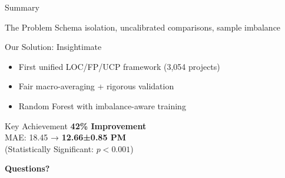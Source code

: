 \documentclass[aspectratio=169]{beamer}
\begin{document}
\begin{frame}{Summary}
\begin{block}{The Problem}
Schema isolation, uncalibrated comparisons, sample imbalance
\end{block}

\vspace{0.2cm}
\begin{block}{Our Solution: Insightimate}
\begin{itemize}
    \item First unified LOC/FP/UCP framework (3,054 projects)
    \item Fair macro-averaging + rigorous validation
    \item Random Forest with imbalance-aware training
\end{itemize}
\end{block}

\vspace{0.2cm}
\begin{exampleblock}{\Large Key Achievement}
\textbf{42\% Improvement}\\
MAE: 18.45 → \textbf{12.66±0.85 PM}\\
(Statistically Significant: $p < 0.001$)
\end{exampleblock}

\vspace{0.3cm}
\begin{center}
\Large \textbf{Questions?}
\end{center}
\end{frame}
\end{document}

